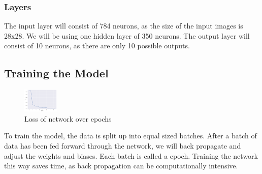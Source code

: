 \documentclass[a1,portrait]{a1poster}
\begin{document}
\begin{multicols}{2}
\subsubsection*{Layers}
The input layer will consist of 784 neurons, as the size of the input images is 28x28. We will be using one hidden layer of 350 neurons. The output layer will consist of 10 neurons, as there are only 10 possible outputs.

\subsection*{Training the Model}
\begin{figure}
    \centering
    \includegraphics[width=0.15\textwidth]{assets/loss.png}
    \caption{Loss of network over epochs}
    \label{fig:loss-over-epochs}
\end{figure}
To train the model, the data is split up into equal sized batches. After a batch of data has been fed forward through the network, we will back propagate and adjust the weights and biases. Each batch is called a epoch. Training the network this way saves time, as back propagation can be computationally intensive. 







\end{multicols}
\end{document}
